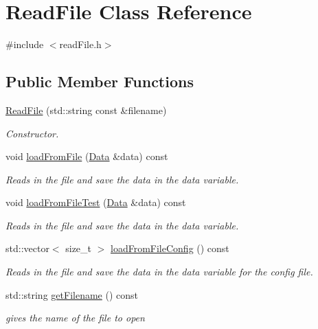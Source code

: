 \hypertarget{class_read_file}{}\section{Read\+File Class Reference}
\label{class_read_file}


{\ttfamily \#include $<$read\+File.\+h$>$}

\subsection*{Public Member Functions}
\begin{DoxyCompactItemize}
\item 
\mbox{\hyperlink{class_read_file_ae297f0539380fc9b703a1bceda2ce820}{Read\+File}} (std\+::string const \&filename)
\begin{DoxyCompactList}\small\item\em Constructor. \end{DoxyCompactList}\item 
void \mbox{\hyperlink{class_read_file_ad801fc147cb2522536db3da40735724b}{load\+From\+File}} (\mbox{\hyperlink{struct_data}{Data}} \&data) const
\begin{DoxyCompactList}\small\item\em Reads in the file and save the data in the data variable. \end{DoxyCompactList}\item 
void \mbox{\hyperlink{class_read_file_ac629f612ecfb04a6ef4414d5feb995bd}{load\+From\+File\+Test}} (\mbox{\hyperlink{struct_data}{Data}} \&data) const
\begin{DoxyCompactList}\small\item\em Reads in the file and save the data in the data variable. \end{DoxyCompactList}\item 
std\+::vector$<$ size\+\_\+t $>$ \mbox{\hyperlink{class_read_file_acae54464293fba0c2f0adcd9d878a176}{load\+From\+File\+Config}} () const
\begin{DoxyCompactList}\small\item\em Reads in the file and save the data in the data variable for the config file. \end{DoxyCompactList}\item 
std\+::string \mbox{\hyperlink{class_read_file_a494ba4e13b3619ff95bb0889f77b95aa}{get\+Filename}} () const
\begin{DoxyCompactList}\small\item\em gives the name of the file to open \end{DoxyCompactList}\item 

\end{DoxyCompactItemize}
